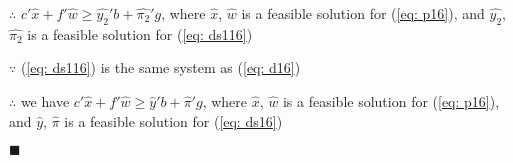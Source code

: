 $\therefore$ $c'\widehat{x}+f'\widehat{w}  \geq \widehat{y_{2}}'b+\widehat{\pi _{2}}'g$, where $\widehat{x}$, $\widehat{w}$ is a feasible solution for (\ref{eq: p16}), and $\widehat{y_{2}}$, $\widehat{\pi _{2}}$ is a feasible solution for (\ref{eq: ds116})

$\because$  (\ref{eq: ds116}) is the same system as (\ref{eq: d16})

$\therefore$ we have $c'\widehat{x}+f'\widehat{w}  \geq \widehat{y}'b+\widehat{\pi }'g$, where $\widehat{x}$, $\widehat{w}$ is a feasible solution for (\ref{eq: p16}), and $\widehat{y}$, $\widehat{\pi }$ is a feasible solution for (\ref{eq: ds16})
\begin{flushright} $\blacksquare$ \end{flushright}
